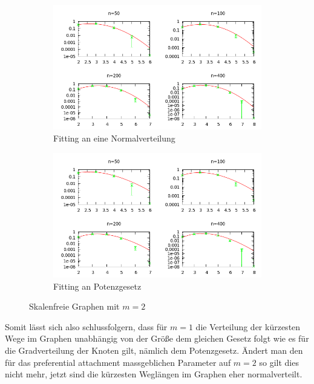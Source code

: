 \documentclass[10pt]{article}
\begin{document}
\begin{figure}[htb!]
\begin{subfigure}{.5\textwidth}
  \centering
  \includegraphics[width=1\linewidth]{../Results/wErrorbars_Normal_M2.png}
  \caption{Fitting an eine Normalverteilung}
\end{subfigure}%
\begin{subfigure}{.5\textwidth}
  \centering
  \includegraphics[width=1\linewidth]{../Results/wErrorbars_Power_M2.png}
  \caption{Fitting an Potenzgesetz}
\end{subfigure}
\caption{Skalenfreie Graphen mit $m=2$}
\label{fig:m2}
\end{figure}

Somit lässt sich also schlussfolgern, dass für $m=1$ die Verteilung der kürzesten Wege im Graphen unabhängig von der Größe dem gleichen Gesetz folgt wie es für die Gradverteilung der Knoten gilt, nämlich dem Potenzgesetz. Ändert man den für das preferential attachment massgeblichen Parameter auf $m=2$ so gilt dies nicht mehr, jetzt sind die kürzesten Weglängen im Graphen eher normalverteilt. 
\end{document}
